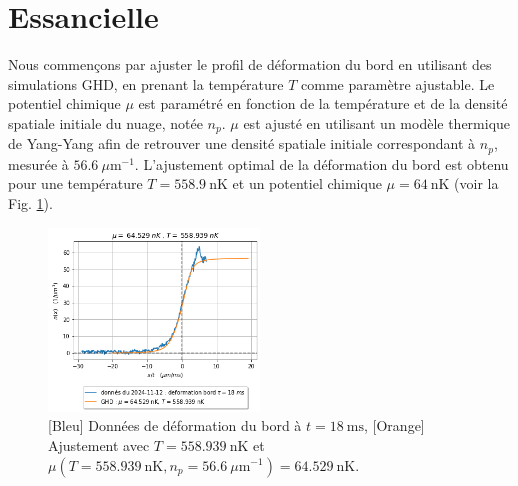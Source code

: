 \documentclass[a3, 10pt,twoside]{article}          %
\theoremstyle{plain}
\theoremstyle{definition}
\theoremstyle{remark}
\theoremstyle{definition} %
\begin{document}
	\section{Essancielle}
	
	
	
	Nous commençons par ajuster le profil de déformation du bord en utilisant des simulations GHD, en prenant la température $T$ comme paramètre ajustable. Le potentiel chimique $\mu$ est paramétré en fonction de la température et de la densité spatiale initiale du nuage, notée $n_p$.  $\mu$  est ajusté en utilisant un modèle thermique de Yang-Yang afin de retrouver une densité spatiale initiale correspondant à $n_p$, mesurée à $56.6 ~\mu \text{m}^{-1}$. L'ajustement optimal de la déformation du bord est obtenu pour une température $T = 558.9~\text{nK}$ et un potentiel chimique $\mu = 64~\text{nK}$ (voir la Fig. \ref{fig:simul_deformation}).


	
	\begin{figure}[ht]
    \centering
    \includegraphics[width=0.5\textwidth]{Figures/simul_deformation}
    \caption{{\color{blue} [Bleu] Données de déformation du bord à $t = 18~\text{ms}$}, {\color{orange}[Orange] Ajustement avec $T = 558.939~\text{nK}$ et $\mu(T = 558.939~\text{nK}, n_p = 56.6~\mu \text{m}^{-1}) = 64.529~\text{nK}$}.}
    \label{fig:simul_deformation}
	\end{figure}
\end{document}
